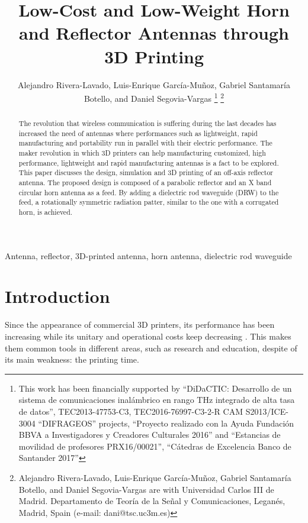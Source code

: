 \documentclass{IEEEtran}
\begin{document}
\title{Low-Cost and Low-Weight Horn and Reflector Antennas through 3D Printing}
\author{Alejandro Rivera-Lavado, Luis-Enrique Garc\'ia-Mu\~noz, Gabriel Santamar\'ia Botello, and Daniel Segovia-Vargas
\thanks{This work has been financially supported by ``DiDaCTIC: Desarrollo de un sistema de comunicaciones inal\'ambrico en rango THz integrado de alta tasa de datos'', TEC2013-47753-C3, TEC2016-76997-C3-2-R CAM S2013/ICE-3004 ``DIFRAGEOS'' projects, ``Proyecto realizado con la Ayuda Fundaci\'on BBVA a Investigadores y Creadores Culturales 2016'' and ``Estancias de movilidad de profesores PRX16/00021'', ``C\'atedras de Excelencia Banco de Santander 2017''}
\thanks{Alejandro Rivera-Lavado, Luis-Enrique Garc\'ia-Mu\~noz, Gabriel Santamar\'ia Botello, and Daniel Segovia-Vargas are with Universidad Carlos III de Madrid. Departamento de Teor\'ia de la Se\~nal y Comunicaciones, Legan\'es, Madrid, Spain (e-mail: dani@tsc.uc3m.es)}}

\maketitle

\begin{abstract}
The revolution that wireless communication is suffering during the last decades has increased the need of antennas where performances such as lightweight, rapid manufacturing and portability run in parallel with their electric performance. The maker revolution in which 3D printers can help manufacturing customized, high performance, lightweight and rapid manufacturing antennas is a fact to be explored. This paper discusses the design, simulation and 3D printing of an off-axis reflector antenna. The proposed design is composed of a parabolic reflector and an X band circular horn antenna as a feed. By adding a dielectric rod waveguide (DRW) to the feed, a rotationally symmetric radiation patter, similar to the one with a corrugated horn, is achieved.
\end{abstract}

\begin{IEEEkeywords}
Antenna, reflector, 3D-printed antenna, horn antenna, dielectric rod waveguide
\end{IEEEkeywords}

\section{Introduction}

Since the appearance of commercial 3D printers, its performance has been increasing while its unitary and operational costs keep decreasing \cite{ref:3DPIntro}. This makes them common tools in different areas, such as research and education, despite of its main weakness: the printing time.
\end{document}
